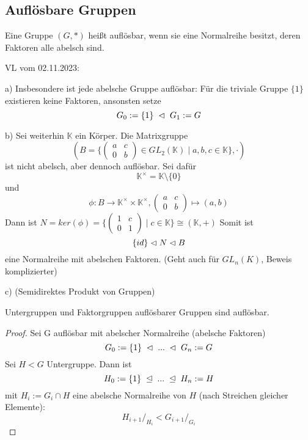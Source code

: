 \documentclass[../main.tex]{subfiles}
\begin{document}
\subsection{Auflösbare Gruppen}
\begin{definition}
    Eine Gruppe $(G,*)$ heißt auflösbar, wenn sie eine Normalreihe besitzt, deren Faktoren alle abelsch sind.
\end{definition}
\begin{flushright}
VL vom 02.11.2023:
\end{flushright}
\begin{example}
    a) Insbesondere ist jede abelsche Gruppe auflösbar: Für die triviale Gruppe $\{1\}$ existieren keine Faktoren, ansonsten setze $$G_0 := \{1\} \; \vartriangleleft \; G_1 := G$$

    b) Sei weiterhin $\mathbb{K}$ ein Körper.
    Die Matrixgruppe $$(B = \{\begin{pmatrix} a & c \\ 0 & b \end{pmatrix} \in GL_2(\mathbb{K}) \mid a,b,c \in \mathbb{K}\}, \cdot)$$ ist nicht abelsch, aber dennoch auflösbar. Sei dafür $$\mathbb{K}^\times = \mathbb{K}\setminus\{0\}$$ und $$\phi: B \rightarrow \mathbb{K}^\times \times \mathbb{K}^\times, \begin{pmatrix} a & c \\ 0 & b
    \end{pmatrix} \mapsto (a,b)$$ Dann ist $N = ker(\phi) = \{\begin{pmatrix}
        1 & c \\ 0 & 1
    \end{pmatrix} \mid c \in \mathbb{K}\} \cong (\mathbb{K},+)$ Somit ist $$\{id\} \vartriangleleft N \vartriangleleft B$$ eine Normalreihe mit abelschen Faktoren. (Geht auch für $GL_n(K)$, Beweis komplizierter)

    c) (Semidirektes Produkt von Gruppen) \TODO
\end{example}
\begin{theorem}\label{thm:ug:aufloesbar}\label{theo:1.12}
    Untergruppen und Faktorgruppen auflösbarer Gruppen sind auflösbar.
\end{theorem}
\begin{proof}
    Sei G auflösbar mit abelscher Normalreihe (abelsche Faktoren) 
    $$G_0 := \{1\} \; \vartriangleleft \; ... \; \vartriangleleft \; G_n := G$$
    Sei $H < G$ Untergruppe. Dann ist $$H_0 := \{1\} \; \trianglelefteq \; ... \; \trianglelefteq \; H_n := H$$ mit $H_i := G_i \cap H$ eine abelsche Normalreihe von $H$ (nach Streichen gleicher Elemente):
    $$H_{i+1}/_{H_i} < G_{i+1}/_{G_i}$$
\end{proof}
\end{document}

